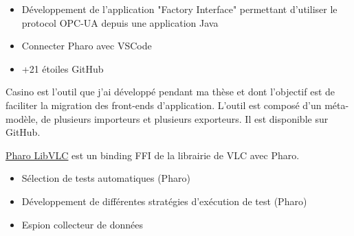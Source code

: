 \documentclass[10pt,a4paper,ragged2e,withhyper]{altacv}
\begin{document}
\divider

\begin{itemize}
  \item Développement de l'application "Factory Interface" permettant d'utiliser le protocol OPC-UA depuis une application Java
\end{itemize}

\newpage


\begin{itemize}
\item Connecter Pharo avec VSCode
\item +21 étoiles GitHub
\end{itemize}

\divider


Casino est l'outil que j'ai développé pendant ma thèse et dont l'objectif est de faciliter la migration des front-ends d'application.
L'outil est composé d'un méta-modèle, de plusieurs importeurs et plusieurs exporteurs.
Il est disponible sur GitHub.

\divider


\href{https://github.com/badetitou/Pharo-LibVLC}
{\color{blue}\underline{Pharo LibVLC}} est un binding FFI de la librairie de VLC avec Pharo.


\divider

\begin{itemize}
\item Sélection de tests automatiques (Pharo)
\item Développement de différentes stratégies d’exécution de test (Pharo)
\end{itemize}

\divider

\begin{itemize}
  \item Espion collecteur de données
\end{itemize}
  
\end{document}

